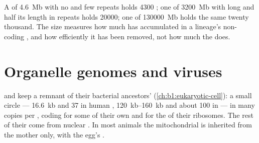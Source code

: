 \begin{example}\label{ex:b1:genomes:sizes}
A  of \qty{4.6}{Mb} with no  and few repeats holds
\num{4300} ; one of \qty{3200}{Mb} with long  and half
its length in repeats holds \num{20000}; one of \qty{130000}{Mb} holds
the same twenty thousand. The size measures how much has accumulated
in a lineage's non-coding , and how efficiently it has been
removed, not how much the  does.
\end{example}

\section{Organelle genomes and viruses}

\begin{definition}\label{def:b1:genomes:organelle}
 and  keep a remnant of their bacterial
ancestors'  (\cref{ch:b1:eukaryotic-cell}): a small circle
--- \qty{16.6}{kb} and 37  in human , \qtyrange{120}{160}{kb}
and about 100  in  --- in many copies per ,
coding for some of their own  and for the  of their
ribosomes. The rest of their  come from nuclear . In most
animals the mitochondrial  is inherited from the mother only,
with the egg's .
\end{definition}

